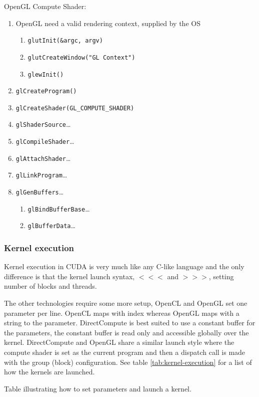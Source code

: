 OpenGL Compute Shader:
\begin{enumerate}
	\item OpenGL need a valid rendering context, supplied by the OS
	\begin{enumerate}
		\item \texttt{glutInit(\&argc, argv)}\;
		\item \texttt{glutCreateWindow("GL Context")}\;
		\item \texttt{glewInit()\;}
	\end{enumerate}
	\item \texttt{glCreateProgram()\;}
	\item \texttt{glCreateShader(GL\_COMPUTE\_SHADER)\;}
	\item \texttt{glShaderSource}\ldots
	\item \texttt{glCompileShader}\ldots
	\item \texttt{glAttachShader}\ldots
	\item \texttt{glLinkProgram}\ldots
	\item \texttt{glGenBuffers}\ldots
	\begin{enumerate}
		\item \texttt{glBindBufferBase}\ldots
		\item \texttt{glBufferData}\ldots
	\end{enumerate}
\end{enumerate}

\subsubsection{Kernel execution}

Kernel execution in CUDA is very much like any C-like language and the only difference is that the kernel launch syntax, $<<<$ and $>>>$, setting number of blocks and threads.

The other technologies require some more setup, OpenCL and OpenGL set one parameter per line. OpenCL maps with index whereas OpenGL maps with a string to the parameter. DirectCompute is best suited to use a constant buffer for the parameters, the constant buffer is read only and accessible globally over the kernel. DirectCompute and OpenGL share a similar launch style where the compute shader is set as the current program and then a dispatch call is made with the group (block) configuration. See table \ref{tab:kernel-execution} for a list of how the kernels are launched.

\begin{table}[h!]
	\centering
	
	\caption{Table illustrating how to set parameters and launch a kernel.}
	\label{tab:kernel-execution}
\end{table}

